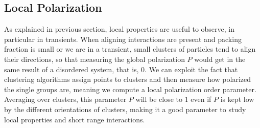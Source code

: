\documentclass[../../master_thesis_np.tex]{subfiles}
\begin{document}
		\subsection{Local Polarization}
		As explained in previous section, local properties are useful to observe, in particular in transients. When aligning interactions are present and packing fraction is small or we are in a transient, small clusters of particles tend to align their directions, so that measuring the global polarization $P$ would get in the same result of a disordered system, that is, $0$. We can exploit the fact that clustering algorithms assign points to clusters and then measure how polarized the single groups are, meaning we compute a local polarization order parameter. Averaging over clusters, this parameter $\bar{P}$ will be close to $1$ even if $P$ is kept low by the different orientations of clusters, making it a good parameter to study local properties and short range interactions.
\end{document}
